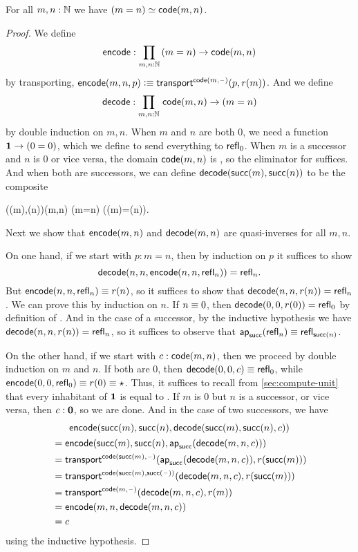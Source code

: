 \begin{thm}\label{thm:path-nat}
  For all $m,n:\mathbb{N}$ we have $(m=n) \simeq \mathsf{code}(m,n)$.
\end{thm}
\begin{proof}
  We define
  \[ \encode : \prd{m,n:\N} (m=n) \to \code(m,n) \]
  by transporting, $\mathsf{encode}(m,n,p) \vcentcolon\equiv \mathsf{transport}^{\mathsf{code}(m,{\mathord{\hspace{1pt}\text{--}\hspace{1pt}}})}(p,r(m))$.
  And we define
  \[ \decode : \prd{m,n:\N} \code(m,n) \to (m=n) \]
  by double induction on $m,n$.
  When $m$ and $n$ are both $0$, we need a function $\mathbf{1} \to (0=0)$, which we define to send everything to $\mathsf{refl}_{0}$.
  When $m$ is a successor and $n$ is $0$ or vice versa, the domain $\mathsf{code}(m,n)$ is \emptyt, so the eliminator for \emptyt suffices.
  And when both are successors, we can define $\mathsf{decode}(\mathsf{succ}(m),\mathsf{succ}(n))$ to be the composite
  \begin{narrowmultline*}
    \code(\suc(m),\suc(n))\jdeq\code(m,n)
     \narrowbreak
    (m=n)
    \xrightarrow{\apfunc{\suc}}
    (\suc(m)=\suc(n)).
  \end{narrowmultline*}
  Next we show that $\mathsf{encode}(m,n)$ and $\mathsf{decode}(m,n)$ are quasi-inverses for all $m,n$.

  On one hand, if we start with $p:m=n$, then by induction on $p$ it suffices to show
  \[\mathsf{decode}(n,n,\mathsf{encode}(n,n,\mathsf{refl}_{n}))=\mathsf{refl}_{n}.\]
  But $\mathsf{encode}(n,n,\mathsf{refl}_{n}) \equiv r(n)$, so it suffices to show that $\mathsf{decode}(n,n,r(n)) =\mathsf{refl}_{n}$.
  We can prove this by induction on $n$.
  If $n\equiv 0$, then $\mathsf{decode}(0,0,r(0)) =\mathsf{refl}_{0}$ by definition of \decode.
  And in the case of a successor, by the inductive hypothesis we have $\mathsf{decode}(n,n,r(n)) = \mathsf{refl}_{n}$, so it suffices to observe that $\mathsf{ap}_{\mathsf{succ}}(\mathsf{refl}_{n}) \equiv \mathsf{refl}_{\mathsf{succ}(n)}$.

  On the other hand, if we start with $c:\mathsf{code}(m,n)$, then we proceed by double induction on $m$ and $n$.
  If both are $0$, then $\mathsf{decode}(0,0,c) \equiv \mathsf{refl}_{0}$, while $\mathsf{encode}(0,0,\mathsf{refl}_{0})\equiv r(0) \equiv \star$.
  Thus, it suffices to recall from \cref{sec:compute-unit} that every inhabitant of $\mathbf{1}$ is equal to \ttt.
  If $m$ is $0$ but $n$ is a successor, or vice versa, then $c:\mathbf{0}$, so we are done.
  And in the case of two successors, we have
  \begin{multline*}
    \mathsf{encode}(\mathsf{succ}(m),\mathsf{succ}(n),\mathsf{decode}(\mathsf{succ}(m),\mathsf{succ}(n),c))\\
    \begin{aligned}
    &= \mathsf{encode}(\mathsf{succ}(m),\mathsf{succ}(n),\mathsf{ap}_{\mathsf{succ}}(\mathsf{decode}(m,n,c)))\\
    &= \mathsf{transport}^{\mathsf{code}(\mathsf{succ}(m),{\mathord{\hspace{1pt}\text{--}\hspace{1pt}}})}(\mathsf{ap}_{\mathsf{succ}}(\mathsf{decode}(m,n,c)),r(\mathsf{succ}(m)))\\
    &= \mathsf{transport}^{\mathsf{code}(\mathsf{succ}(m),\mathsf{succ}({\mathord{\hspace{1pt}\text{--}\hspace{1pt}}}))}(\mathsf{decode}(m,n,c),r(\mathsf{succ}(m)))\\
    &= \mathsf{transport}^{\mathsf{code}(m,{\mathord{\hspace{1pt}\text{--}\hspace{1pt}}})}(\mathsf{decode}(m,n,c),r(m))\\
    &= \mathsf{encode}(m,n,\mathsf{decode}(m,n,c))\\
    &= c
  \end{aligned}
  \end{multline*}
  using the inductive hypothesis.
\end{proof}

